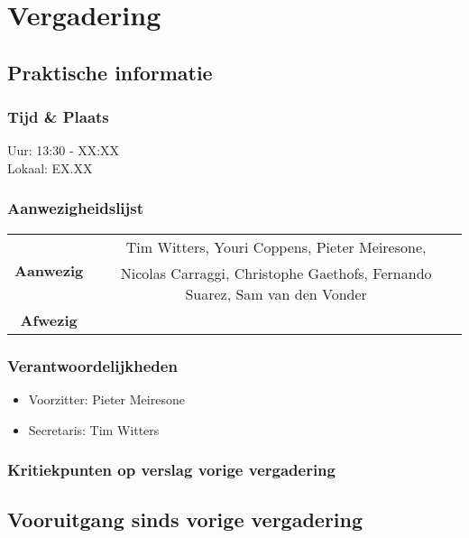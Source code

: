 \section{Vergadering \MeetingDate}
\subsection{Praktische informatie}
\subsubsection{Tijd \& Plaats}
Uur: 13:30 - XX:XX
\\
Lokaal: EX.XX
\subsubsection{Aanwezigheidslijst}
\begin{table}[htbp]
	\centering
	\begin{tabular}{c|c}
		\multirow{2}{*}{\textbf{Aanwezig}} & Tim Witters, Youri Coppens, Pieter Meiresone, \\
		& Nicolas Carraggi,  Christophe Gaethofs, Fernando Suarez, Sam van den Vonder \\
		\hline
		\textbf{Afwezig} & \\
	\end{tabular}
\end{table}

\subsubsection{Verantwoordelijkheden}
\begin{itemize}
	\item Voorzitter: Pieter Meiresone
	\item Secretaris: Tim Witters
\end{itemize}

\subsubsection{Kritiekpunten op verslag vorige vergadering}

\subsection{Vooruitgang sinds vorige vergadering}

